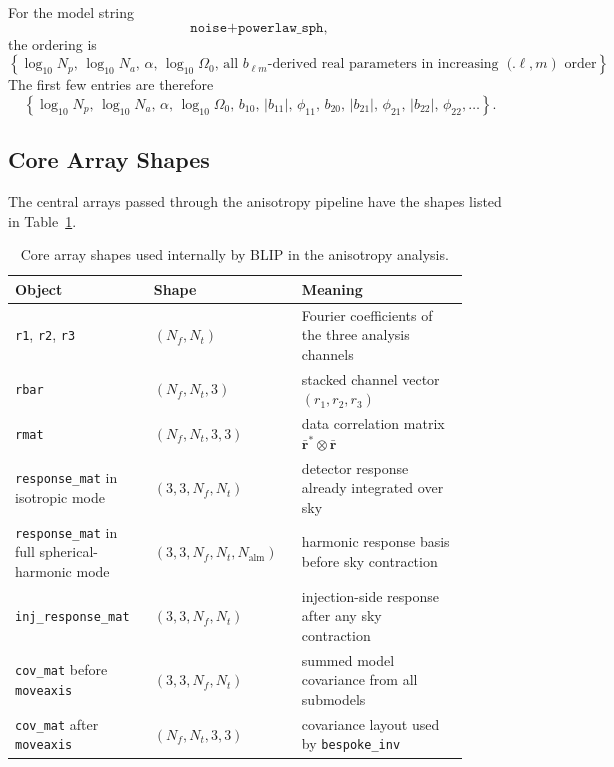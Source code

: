 \documentclass[11pt]{article}
\begin{document}
For the model string
\begin{equation}
\texttt{noise+powerlaw\_sph},
\end{equation}
the ordering is
\begin{equation}
\left\{
\log_{10}N_p,\,
\log_{10}N_a,\,
\alpha,\,
\log_{10}\Omega_0,\,
\text{all } b_{\ell m}\text{-derived real parameters in increasing }(\ell,m)\text{ order}
\right\}.
\end{equation}
The first few entries are therefore
\begin{equation}
\left\{
\log_{10}N_p,\,
\log_{10}N_a,\,
\alpha,\,
\log_{10}\Omega_0,\,
b_{10},\,
|b_{11}|,\,
\phi_{11},\,
b_{20},\,
|b_{21}|,\,
\phi_{21},\,
|b_{22}|,\,
\phi_{22},\dots
\right\}.
\end{equation}

\subsection{Core Array Shapes}
The central arrays passed through the anisotropy pipeline have the shapes listed in Table~\ref{tab:arrayshapes}.

\begin{table}[H]
\centering
\caption{Core array shapes used internally by BLIP in the anisotropy analysis.}
\label{tab:arrayshapes}
\begin{tabular}{>{\raggedright\arraybackslash}p{0.28\linewidth} >{\raggedright\arraybackslash}p{0.28\linewidth} >{\raggedright\arraybackslash}p{0.34\linewidth}}
\toprule
Object & Shape & Meaning \\
\midrule
\texttt{r1}, \texttt{r2}, \texttt{r3} & $(N_f,N_t)$ & Fourier coefficients of the three analysis channels \\
\texttt{rbar} & $(N_f,N_t,3)$ & stacked channel vector $(r_1,r_2,r_3)$ \\
\texttt{rmat} & $(N_f,N_t,3,3)$ & data correlation matrix $\bar{\mathbf{r}}^\ast\otimes\bar{\mathbf{r}}$ \\
\texttt{response\_mat} in isotropic mode & $(3,3,N_f,N_t)$ & detector response already integrated over sky \\
\texttt{response\_mat} in full spherical-harmonic mode & $(3,3,N_f,N_t,N_{\mathrm{alm}})$ & harmonic response basis before sky contraction \\
\texttt{inj\_response\_mat} & $(3,3,N_f,N_t)$ & injection-side response after any sky contraction \\
\texttt{cov\_mat} before \texttt{moveaxis} & $(3,3,N_f,N_t)$ & summed model covariance from all submodels \\
\texttt{cov\_mat} after \texttt{moveaxis} & $(N_f,N_t,3,3)$ & covariance layout used by \texttt{bespoke\_inv} \\
\bottomrule
\end{tabular}
\end{table}
\end{document}
